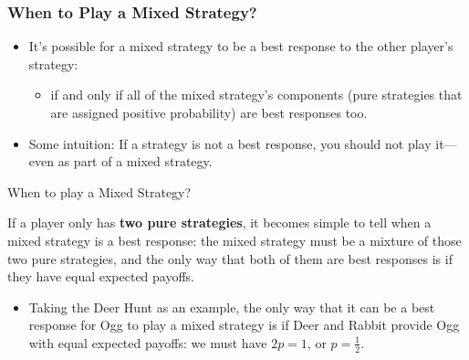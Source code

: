 
\begin{frame}
\frametitle{When to Play a Mixed Strategy?}
\begin{itemize}

	\item It's possible for a mixed strategy to be a best response to the other player's strategy:

  \begin{itemize}
    \item if and only if all of the mixed strategy's \alert{components} (pure strategies that are assigned positive probability) are best responses too.
  \end{itemize}

	\item Some intuition: If a strategy is not a best response, you should not play it---even as part of a mixed strategy.

\end{itemize}
\end{frame}


\begin{frame}{When to play a Mixed Strategy?}

  If a player only has \textbf{two pure strategies}, it becomes simple to tell when a mixed strategy is a best response: the mixed strategy must be a mixture of those two pure strategies, and the only way that both of them are best responses is if they have equal expected payoffs.

\begin{itemize}
	\item Taking the Deer Hunt as an example, the only way that it can be a best response for Ogg to play a mixed strategy is if Deer and Rabbit provide Ogg with equal expected payoffs: we must have $2p = 1$, or $p = \frac{1}{2}$.
\end{itemize}
\end{frame}



